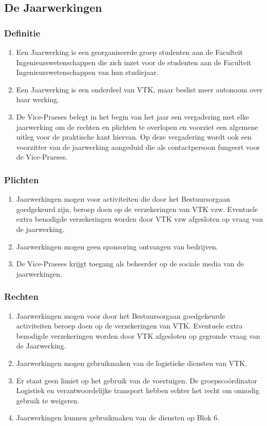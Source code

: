 \subsection{De Jaarwerkingen}

    \subsubsection{Definitie}
    \begin{enumerate}
    \item Een Jaarwerking is een georganiseerde groep studenten aan de Faculteit Ingenieurswetenschappen die zich inzet voor de studenten aan de Faculteit Ingenieurswetenschappen van hun studiejaar.
    \item Een Jaarwerking is een onderdeel van VTK, maar beslist meer autonoom over haar werking. 
    \item De Vice-Praeses belegt in het begin van het jaar een vergadering met elke jaarwerking om de rechten en plichten te overlopen en voorziet een algemene uitleg voor de praktische kant hiervan. Op deze vergadering wordt ook een voorzitter van de jaarwerking aangeduid die als contactpersoon fungeert voor de Vice-Praeses.
    \end{enumerate}

    \subsubsection{Plichten}
    \begin{enumerate}
    \item Jaarwerkingen mogen voor activiteiten die door het Bestuursorgaan goedgekeurd zijn, beroep doen op de verzekeringen van VTK vzw. Eventuele extra benodigde verzekeringen worden door VTK vzw afgesloten op vraag van de jaarwerking.
    \item Jaarwerkingen mogen geen sponsoring ontvangen van bedrijven.
    \item De Vice-Praeses krijgt toegang als beheerder op de sociale media van de jaarwerkingen.
    \end{enumerate}

    \subsubsection{Rechten}
    \begin{enumerate}
    \item Jaarwerkingen mogen voor door het Bestuursorgaan goedgekeurde activiteiten beroep doen op de verzekeringen van VTK. Eventuele extra benodigde verzekeringen worden door VTK afgesloten op gegronde vraag van de Jaarwerking.
    \item Jaarwerkingen mogen gebruikmaken van de logistieke diensten van VTK. 
    \item Er staat geen limiet op het gebruik van de voertuigen. De groepscoördinator Logistiek en verantwoordelijke transport hebben echter het recht om onnodig gebruik te weigeren.
    \item Jaarwerkingen kunnen gebruikmaken van de diensten op Blok 6.
    \end{enumerate}

